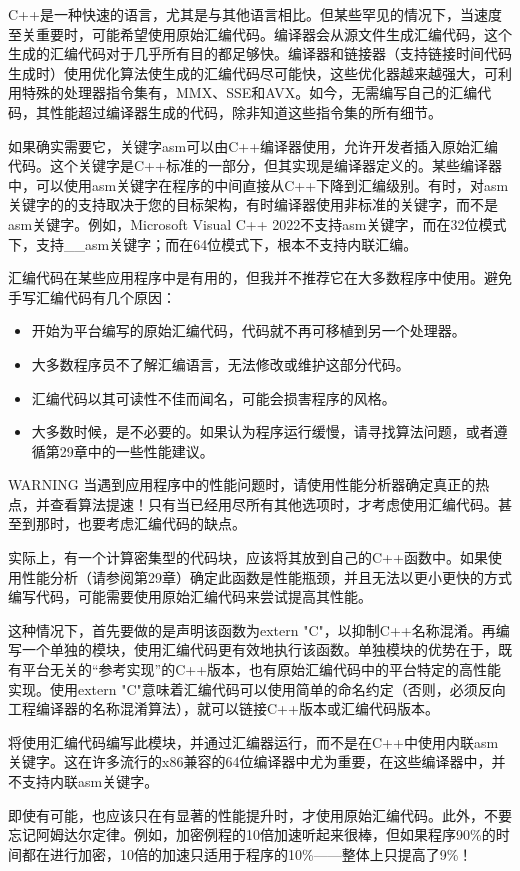 
C++是一种快速的语言，尤其是与其他语言相比。但某些罕见的情况下，当速度至关重要时，可能希望使用原始汇编代码。编译器会从源文件生成汇编代码，这个生成的汇编代码对于几乎所有目的都足够快。编译器和链接器（支持链接时间代码生成时）使用优化算法使生成的汇编代码尽可能快，这些优化器越来越强大，可利用特殊的处理器指令集有，MMX、SSE和AVX。如今，无需编写自己的汇编代码，其性能超过编译器生成的代码，除非知道这些指令集的所有细节。

如果确实需要它，关键字asm可以由C++编译器使用，允许开发者插入原始汇编代码。这个关键字是C++标准的一部分，但其实现是编译器定义的。某些编译器中，可以使用asm关键字在程序的中间直接从C++下降到汇编级别。有时，对asm关键字的的支持取决于您的目标架构，有时编译器使用非标准的关键字，而不是asm关键字。例如，Microsoft Visual C++ 2022不支持asm关键字，而在32位模式下，支持\_\_asm关键字；而在64位模式下，根本不支持内联汇编。

汇编代码在某些应用程序中是有用的，但我并不推荐它在大多数程序中使用。避免手写汇编代码有几个原因：

\begin{itemize}
\item
开始为平台编写的原始汇编代码，代码就不再可移植到另一个处理器。

\item
大多数程序员不了解汇编语言，无法修改或维护这部分代码。

\item
汇编代码以其可读性不佳而闻名，可能会损害程序的风格。

\item
大多数时候，是不必要的。如果认为程序运行缓慢，请寻找算法问题，或者遵循第29章中的一些性能建议。
\end{itemize}

\begin{myWarning}{WARNING}
当遇到应用程序中的性能问题时，请使用性能分析器确定真正的热点，并查看算法提速！只有当已经用尽所有其他选项时，才考虑使用汇编代码。甚至到那时，也要考虑汇编代码的缺点。
\end{myWarning}

实际上，有一个计算密集型的代码块，应该将其放到自己的C++函数中。如果使用性能分析（请参阅第29章）确定此函数是性能瓶颈，并且无法以更小更快的方式编写代码，可能需要使用原始汇编代码来尝试提高其性能。

这种情况下，首先要做的是声明该函数为extern "C"，以抑制C++名称混淆。再编写一个单独的模块，使用汇编代码更有效地执行该函数。单独模块的优势在于，既有平台无关的“参考实现”的C++版本，也有原始汇编代码中的平台特定的高性能实现。使用extern "C"意味着汇编代码可以使用简单的命名约定（否则，必须反向工程编译器的名称混淆算法），就可以链接C++版本或汇编代码版本。

将使用汇编代码编写此模块，并通过汇编器运行，而不是在C++中使用内联asm关键字。这在许多流行的x86兼容的64位编译器中尤为重要，在这些编译器中，并不支持内联asm关键字。

即使有可能，也应该只在有显著的性能提升时，才使用原始汇编代码。此外，不要忘记阿姆达尔定律。例如，加密例程的10倍加速听起来很棒，但如果程序90\%的时间都在进行加密，10倍的加速只适用于程序的10\%——整体上只提高了9\%！






